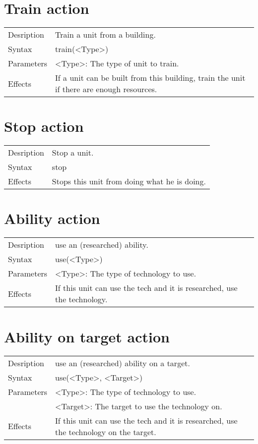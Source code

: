 \documentclass[english,11pt]{report}
\begin{document}
\section{Train action}
\begin{tabularx}{\textwidth}{lX}
 Desription & Train a unit from a building. \\
 Syntax & train(<Type>) \\
 Parameters & <Type>: The type of unit to train.\\
 Effects &  If a unit can be built from this building, train the unit if there are enough resources.
\end{tabularx}

\section{Stop action}
\begin{tabularx}{\textwidth}{lX}
 Desription & Stop a unit. \\
 Syntax & stop \\
 Effects &  Stops this unit from doing what he is doing.
\end{tabularx}

\section{Ability action}
\begin{tabularx}{\textwidth}{lX}
 Desription & use an (researched) ability. \\
 Syntax & use(<Type>) \\
 Parameters & <Type>: The type of technology to use.\\
 Effects &  If this unit can use the tech and it is researched, use the technology.
\end{tabularx}

\section{Ability on target action}
\begin{tabularx}{\textwidth}{lX}
 Desription & use an (researched) ability on a target. \\
 Syntax & use(<Type>, <Target>) \\
 Parameters & <Type>: The type of technology to use.\\
            & <Target>: The target to use the technology on.\\
 Effects &  If this unit can use the tech and it is researched, use the technology on the target.
\end{tabularx}
\end{document}
